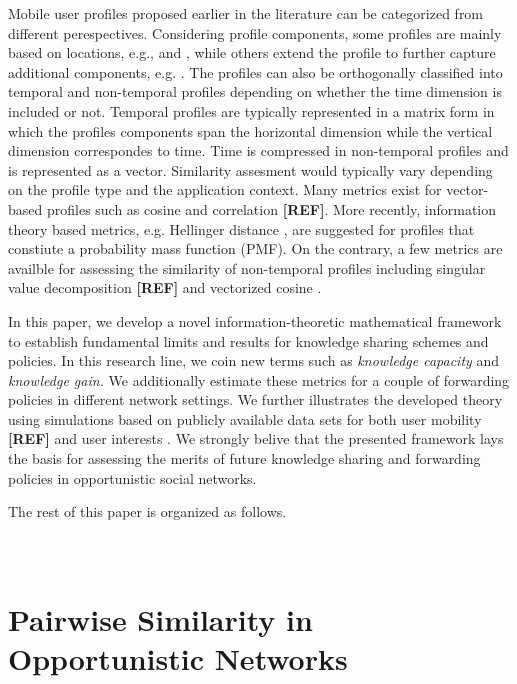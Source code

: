 \documentclass{elsarticle}
\begin{document}
Mobile user profiles proposed earlier in the literature can be categorized
from different perespectives. Considering profile components, some
profiles are mainly based on locations, e.g., \citet{profilecast}
and \citet{csi}, while others extend the profile to further capture
additional components, e.g. \citet{uspatent,mogh,Mai13}. The profiles
can also be orthogonally classified into temporal and non-temporal
profiles depending on whether the time dimension is included or not.
Temporal profiles are typically represented in a matrix form in which
the profiles components span the horizontal dimension while the vertical
dimension correspondes to time. Time is compressed in non-temporal
profiles and is represented as a vector. Similarity assesment would
typically vary depending on the profile type and the application context.
Many metrics exist for vector-based profiles such as cosine and correlation
\textbf{{[}REF{]}}. More recently, information theory based metrics,
e.g. Hellinger distance \citet{Mai13}, are suggested for profiles
that constiute a probability mass function (PMF). On the contrary,
a few metrics are availble for assessing the similarity of non-temporal
profiles including singular value decomposition \textbf{{[}REF{]}}
and vectorized cosine \citet{Mai13}. 

In this paper, we develop a novel information-theoretic mathematical
framework to establish fundamental limits and results for knowledge
sharing schemes and policies. In this research line, we coin new terms
such as \emph{knowledge capacity} and \emph{knowledge gain. }We additionally
estimate these metrics for a couple of forwarding policies in different
network settings. We further illustrates the developed theory using
simulations based on publicly available data sets for both user mobility
\textbf{{[}REF{]}} and user interests \citet{data} . We strongly
belive that the presented framework lays the basis for assessing the
merits of future knowledge sharing and forwarding policies in opportunistic
social networks. 

The rest of this paper is organized as follows. \\
\\
\\



\section{Pairwise Similarity in Opportunistic Networks }
\end{document}
